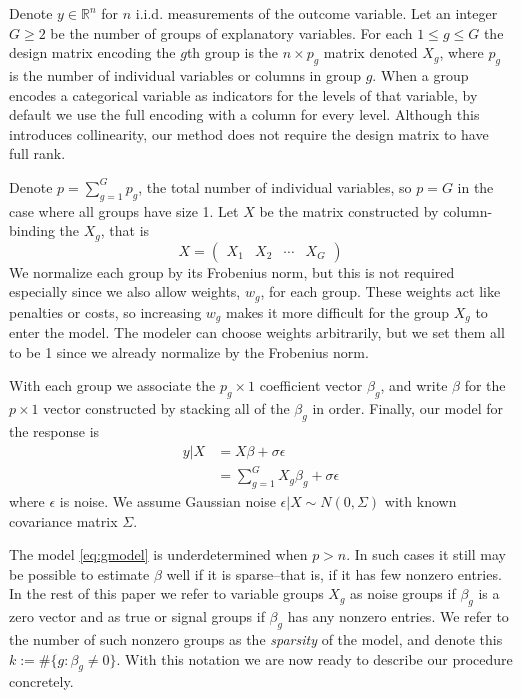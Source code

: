 \documentclass{imsart}
\newcommand{\real}{\mathbb{R}}
\begin{document}
Denote $y \in \real^n$ for $n$ i.i.d. measurements of the outcome variable.
Let an integer $G \geq 2$ be the number of groups of explanatory variables.
For each $1 \leq g \leq G$ the design matrix encoding the
$g$th group is the $n \times p_g$ matrix denoted $X_g$, where $p_g$ is
the number of individual variables or columns in group $g$.
When a group encodes a categorical variable as indicators for the
levels of that variable, by default we use the full encoding with a
column for every level. Although this introduces collinearity, our method
does not require the design matrix to have full rank.


Denote $p = \sum_{g=1}^Gp_g$,
the total number of individual variables, so $p = G$ in the
case where all groups have size 1. Let $X$ be the matrix constructed
by column-binding the $X_g$, that is  
\begin{equation*}
X = \begin{pmatrix} X_1 & X_2 & \cdots & X_G  \end{pmatrix}
\end{equation*}
We normalize each group by its Frobenius norm, but this is not required
especially since we also allow weights, $w_g$, for each group. These
weights act like penalties or costs, so increasing $w_g$ makes it
more difficult for the group $X_g$ to enter the model. The
modeler can choose weights arbitrarily, but we set them all to be
1 since we already normalize by the Frobenius norm.

With each group we associate the $p_g \times 1$ coefficient vector
$\beta_g$, and write $\beta$ for the $p \times 1$ vector constructed
by stacking all of the $\beta_g$ in order.  Finally, our model for the
response is
\begin{equation}
\begin{aligned}
\label{eq:gmodel}
y | X& = X \beta + \sigma \epsilon \\
   & = \sum_{g=1}^G X_g \beta_g + \sigma \epsilon
\end{aligned}
\end{equation}
where $\epsilon$ is noise. We assume Gaussian noise
$\epsilon | X \sim N(0, \Sigma)$ with known covariance matrix $\Sigma$.


The model \eqref{eq:gmodel} is underdetermined when $p > n$.
In such cases it still may be possible to
estimate $\beta$ well if it is sparse--that is, if it has few nonzero
entries. In the rest of this paper we refer to variable groups $X_g$
as noise groups if $\beta_g$ is a zero vector and as true or signal
groups if $\beta_g$ has any nonzero entries. We refer to the number
of such nonzero groups as the \textit{sparsity} of the model, and
denote this $k := \# \{ g : \beta_g \neq 0 \}$. With this notation
we are now ready to describe our procedure concretely.
\end{document}
